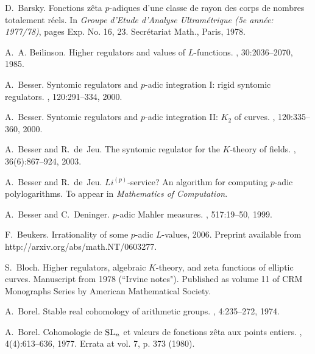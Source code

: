 \documentclass{amsart}
\begin{document}
\begin{thebibliography}{10}

D.~Barsky.
\newblock Fonctions z\^eta $p$-adiques d'une classe de rayon des corps de
  nombres totalement r\'eels.
\newblock In {\em Groupe d'Etude d'Analyse Ultram\'etrique (5e ann\'ee:
  1977/78)}, pages Exp. No. 16, 23. Secr\'etariat Math., Paris, 1978.

A.~A. Beilinson.
\newblock Higher regulators and values of ${L}$-functions.
, 30:2036--2070, 1985.

A.~Besser.
\newblock Syntomic regulators and $p$-adic integration {I}: rigid syntomic
  regulators.
, 120:291--334, 2000.

A.~Besser.
\newblock Syntomic regulators and $p$-adic integration {II}: {$K_2$} of curves.
, 120:335--360, 2000.

A.~Besser and R.~de~Jeu.
\newblock The syntomic regulator for the $ {K} $-theory of fields.
,
  36(6):867--924, 2003.

A.~Besser and R.~de~Jeu.
\newblock $ {L}i^{(p)} $-service? {A}n algorithm for computing $ p $-adic
  polylogarithms.
\newblock To appear in {\it Mathematics of Computation}.

A.~Besser and C.~Deninger.
\newblock $p$-adic {M}ahler measures.
, 517:19--50, 1999.

F.~Beukers.
\newblock Irrationality of some $p$-adic ${L}$-values, 2006.
\newblock Preprint available from http://arxiv.org/abs/math.NT/0603277.

S.~Bloch.
\newblock Higher regulators, algebraic ${K}$-theory, and zeta functions of
  elliptic curves.
\newblock Manuscript from 1978 (``Irvine notes"). Published as volume 11 of CRM
  Monographs Series by American Mathematical Society.

A.~Borel.
\newblock Stable real cohomology of arithmetic groups.
, 4:235--272, 1974.

A.~Borel.
\newblock Cohomologie de {${\rm SL}\sb{n}$} et valeurs de fonctions z\^eta aux
  points entiers.
, 4(4):613--636, 1977.
\newblock Errata at vol. 7, p. 373 (1980).


\end{thebibliography}
\end{document}
